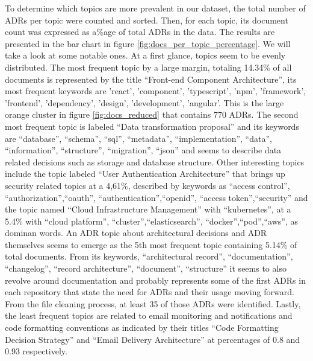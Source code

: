         To determine which topics are more prevalent in our dataset, the total number of ADRs per topic were counted and sorted. Then, for each topic, its document count was expressed as a\%age of total ADRs in the data. The results are presented in the bar chart in figure \ref{fig:docs_per_topic_percentage}. We will take a look at some notable ones. At a first glance, topics seem to be evenly distributed. The most frequent topic by a large margin, totaling 14.34\% of all documents is represented by the title ``Front-end Component Architecture'', its most frequent keywords are 'react', 'component', 'typescript', 'npm', 'framework', 'frontend', 'dependency', 'design', 'development', 'angular'. This is the large orange cluster in figure \ref{fig:docs_reduced} that contains 770 ADRs. The second most frequent topic is labeled ``Data transformation proposal'' and its keywords are ``database'', ``schema'', ``sql'', ``metadata'', ``implementation'', ``data'', ``information'', ``structure'', ``migration'', ``json'' and seems to describe data related decisions such as storage and database structure. Other interesting topics include the topic labeled ``User Authentication Architecture'' that brings up security related topics at a 4,61\%, described by keywords as ``access control'', ``authorization'',``oauth'', ``authentication'',``openid'', ``access token'',``security'' and the topic named ``Cloud Infrastructure Management'' with ``kubernetes'', at a 5.4\% with ``cloud platform'', ``cluster'',``elasticsearch'', ``docker'',``pod'',``aws'', as dominan words. An ADR topic about architectural decisions and ADR themselves seems to emerge as the 5th most frequent topic containing 5.14\% of total documents. From its keywords, ``architectural record'', ``documentation'', ``changelog'', ``record architecture'', ``document'', ``structure'' it seems to also revolve around documentation and probably represents some of the first ADRs in each repository that state the need for ADRs and their usage moving forward. From the file cleaning process, at least 35 of those ADRs were identified. Lastly, the least frequent topics are related to email monitoring and notifications and code formatting conventions as indicated by their titles ``Code Formatting Decision Strategy'' and ``Email Delivery Architecture'' at percentages of 0.8 and 0.93 respectively. 

